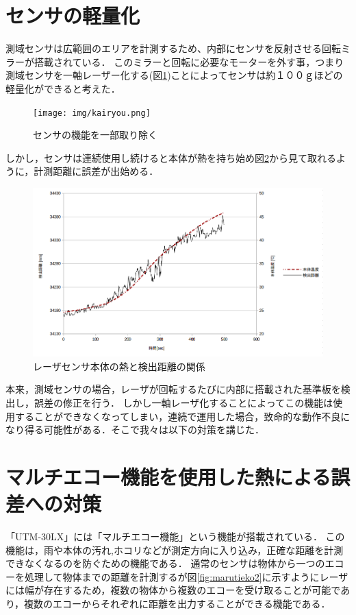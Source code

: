\documentclass[12pt,oneside]{sotsuken_paper}
\begin{document}
\section{センサの軽量化}
測域センサは広範囲のエリアを計測するため、内部にセンサを反射させる回転ミラーが搭載されている．
このミラーと回転に必要なモーターを外す事，つまり測域センサを一軸レーザー化する(図\ref{fig:kairyou})ことによってセンサは約１００ｇほどの軽量化ができると考えた．

\begin{figure}[H]
\begin{center}
\texttt{[image: img/kairyou.png]}
\end{center}
\caption{センサの機能を一部取り除く}
\label{fig:kairyou}
\end{figure}

しかし，センサは連続使用し続けると本体が熱を持ち始め図\ref{fig:gurahu}から見て取れるように，計測距離に誤差が出始める．

\begin{figure}[H]
\begin{center}
\includegraphics[width=160mm]{img/gurahu.png}
\end{center}
\caption{レーザセンサ本体の熱と検出距離の関係}
\label{fig:gurahu}
\end{figure}

本来，測域センサの場合，レーザが回転するたびに内部に搭載された基準板を検出し，誤差の修正を行う．
しかし一軸レーザ化することによってこの機能は使用することができなくなってしまい，連続で運用した場合，致命的な動作不良になり得る可能性がある．そこで我々は以下の対策を講じた．

\section{マルチエコー機能を使用した熱による誤差への対策}
「UTM-30LX」には「マルチエコー機能」という機能が搭載されている．
この機能は，雨や本体の汚れ,ホコリなどが測定方向に入り込み，正確な距離を計測できなくなるのを防ぐための機能である\cite{si2014}．
通常のセンサは物体から一つのエコーを処理して物体までの距離を計測するが図\ref{fig:marutieko2}に示すようにレーザには幅が存在するため，複数の物体から複数のエコーを受け取ることが可能であり，複数のエコーからそれぞれに距離を出力することができる機能である．
\end{document}

